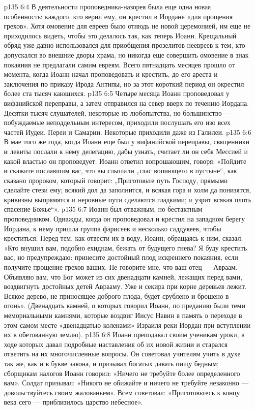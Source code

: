 \vs p135 6:4 В деятельности проповедника\hyp{}назорея была еще одна новая особенность: каждого, кто верил ему, он крестил в Иордане «для прощения грехов». Хотя омовение для евреев было отнюдь не новой церемонией, им еще не приходилось видеть, чтобы это делалось так, как теперь Иоанн. Крещальный обряд уже давно использовался для приобщения прозелитов\hyp{}неевреев к тем, кто допускался во внешние дворы храма, но никогда еще совершить омовение в знак покаяния не предлагали самим евреям. Всего пятнадцать месяцев прошло от момента, когда Иоанн начал проповедовать и крестить, до его ареста и заключения по приказу Ирода Антипы, но за этот короткий период он окрестил более ста тысяч кающихся.
\vs p135 6:5 Четыре месяца Иоанн проповедовал у вифанийской переправы, а затем отправился на север вверх по течению Иордана. Десятки тысяч слушателей, некоторые из любопытства, но большинство --- побуждаемые неподдельным интересом, приходили послушать его изо всех частей Иудеи, Переи и Самарии. Некоторые приходили даже из Галилеи.
\vs p135 6:6 В мае того же года, когда Иоанн еще был у вифанийской переправы, священники и левиты послали к нему делегацию, дабы узнать, считает ли он себя Мессией и какой властью он проповедует. Иоанн ответил вопрошающим, говоря: «Пойдите и скажите пославшим вас, что вы слышали „глас вопиющего в пустыне“, как сказано пророком, который говорит: „Приготовьте путь Господу, прямыми сделайте стези ему; всякий дол да заполнится, и всякая гора и холм да понизятся, кривизны выпрямятся и неровные пути сделаются гладкими; и узрит всякая плоть спасение Божье“».
\vs p135 6:7 Иоанн был отважным, но бестактным проповедником. Однажды, когда он проповедовал и крестил на западном берегу Иордана, к нему пришла группа фарисеев и несколько саддукеев, чтобы креститься. Перед тем, как отвести их в воду, Иоанн, обращаясь к ним, сказал: «Кто внушил вам, подобно ехиднам, бежать от будущего гнева? Я буду крестить вас, но предупреждаю: принесите достойный плод искреннего покаяния, если получите прощение грехов ваших. Не говорите мне, что ваш отец --- Авраам. Объявляю вам, что Бог может из сих двенадцати камней, лежащих перед вами, воздвигнуть достойных детей Аврааму. Уже и секира при корне деревьев лежит. Всякое дерево, не приносящее доброго плода, будет срублено и брошено в огонь». (Двенадцать камней, о которых говорил Иоанн, по преданию были теми мемориальными камнями, которые воздвиг Иисус Навин в память о переходе в этом самом месте «двенадцатью коленами» Израиля реки Иордан при вступлении их в обетованную землю).
\vs p135 6:8 Иоанн преподавал своим ученикам уроки, в ходе которых давал подробные наставления об их новой жизни и старался ответить на их многочисленные вопросы. Он советовал учителям учить в духе так же, как и в букве закона, и призывал богатых давать пищу бедным; сборщикам налогов Иоанн говорил: «Ничего не требуйте более определенного вам». Солдат призывал: «Никого не обижайте и ничего не требуйте незаконно --- довольствуйтесь своим жалованьем». Всем советовал: «Приготовьтесь к концу века сего --- приблизилось царство небесное».
